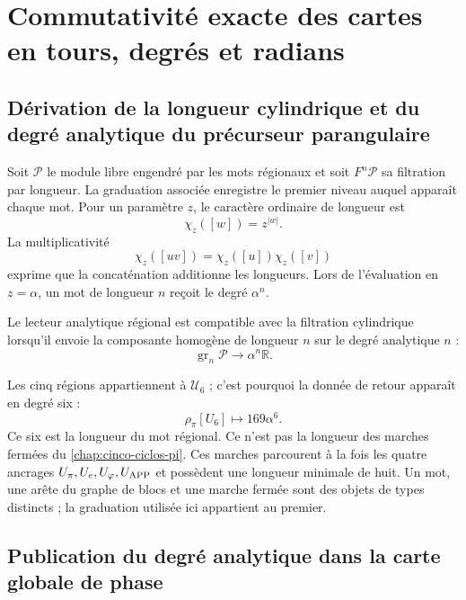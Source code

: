 \section{Commutativité exacte des cartes en tours, degrés et radians}
\label{sec:s102:c38:5}

\subsection{Dérivation de la longueur cylindrique et du degré analytique du précurseur parangulaire}
\label{sec:s102:c38:5:1}


Soit \(\mathcal P\) le module libre engendré par les mots régionaux et
soit \(F^n\mathcal P\) sa filtration par longueur. La graduation associée
enregistre le premier niveau auquel apparaît chaque mot. Pour un paramètre
\(z\), le caractère ordinaire de longueur est
\[
\chi_z([w])=z^{|w|}.
\]
La multiplicativité
\[
\chi_z([uv])=\chi_z([u])\chi_z([v])
\]
exprime que la concaténation additionne les longueurs. Lors de l'évaluation en
\(z=\alpha\), un mot de longueur \(n\) reçoit le degré \(\alpha^n\).

\begin{definition}
\label{p3-83-c30-s1:def:compatibilidad-grado}
Le lecteur analytique régional est compatible avec la filtration cylindrique
lorsqu'il envoie la composante homogène de longueur \(n\) sur le degré analytique
\(n\) :
\[
\operatorname{gr}_n\mathcal P\longrightarrow
\alpha^n\mathbb R.
\]
\end{definition}

Les cinq régions appartiennent à \(\mathcal U_6\) ; c'est pourquoi la donnée de
retour apparaît en degré six :
\[
\rho_\pi[U_6]\longmapsto169\alpha^6.
\]
Ce six est la longueur du mot régional. Ce n'est pas la longueur des
marches fermées du \cref{chap:cinco-ciclos-pi}. Ces marches parcourent à
la fois les quatre ancrages
\(U_\pi,U_e,U_\varphi,U_{\rm APP}\) et possèdent une longueur minimale de huit. Un
mot, une arête du graphe de blocs et une marche fermée sont des objets de
types distincts ; la graduation utilisée ici appartient au premier.

\subsection{Publication du degré analytique dans la carte globale de phase}
\label{sec:s102:c38:5:2}

